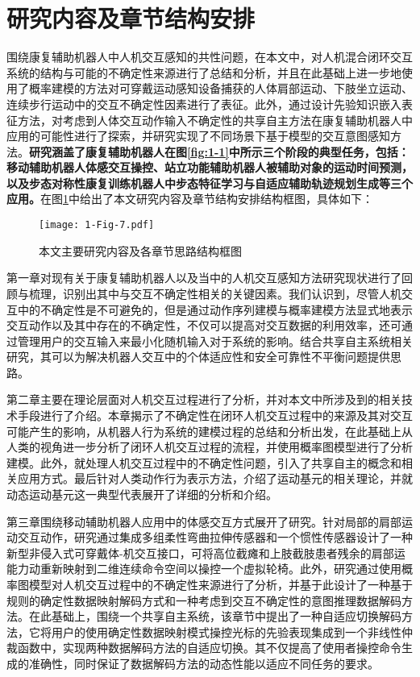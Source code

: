 \section{研究内容及章节结构安排}
围绕康复辅助机器人中人机交互感知的共性问题，在本文中，对人机混合闭环交互系统的结构与可能的不确定性来源进行了总结和分析，并且在此基础上进一步地使用了概率建模的方法对可穿戴运动感知设备捕获的人体肩部运动、下肢坐立运动、连续步行运动中的交互不确定性因素进行了表征。此外，通过设计先验知识嵌入表征方法，对考虑到人体交互动作输入不确定性的共享自主方法在康复辅助机器人中应用的可能性进行了探索，并研究实现了不同场景下基于模型的交互意图感知方法。\textbf{研究涵盖了康复辅助机器人在图\ref{fig:1-1}中所示三个阶段的典型任务，包括：移动辅助机器人体感交互操控、站立功能辅助机器人被辅助对象的运动时间预测，以及步态对称性康复训练机器人中步态特征学习与自适应辅助轨迹规划生成等三个应用。}在图\ref{fig:1-7}中给出了本文研究内容及章节结构安排结构框图，具体如下：

\begin{figure}[htb]
  \centering
  \texttt{[image: 1-Fig-7.pdf]}
  \caption{本文主要研究内容及各章节思路结构框图}
  \label{fig:1-7}
\end{figure}

第一章对现有关于康复辅助机器人以及当中的人机交互感知方法研究现状进行了回顾与梳理，识别出其中与交互不确定性相关的关键因素。我们认识到，尽管人机交互中的不确定性是不可避免的，但是通过动作序列建模与概率建模方法显式地表示交互动作以及其中存在的不确定性，不仅可以提高对交互数据的利用效率，还可通过管理用户的交互输入来最小化随机输入对于系统的影响。结合共享自主系统相关研究，其可以为解决机器人交互中的个体适应性和安全可靠性不平衡问题提供思路。

第二章主要在理论层面对人机交互过程进行了分析，并对本文中所涉及到的相关技术手段进行了介绍。本章揭示了不确定性在闭环人机交互过程中的来源及其对交互可能产生的影响，从机器人行为系统的建模过程的总结和分析出发，在此基础上从人类的视角进一步分析了闭环人机交互过程的流程，并使用概率图模型进行了分析建模。此外，就处理人机交互过程中的不确定性问题，引入了共享自主的概念和相关应用方式。最后针对人类动作行为表示方法，介绍了运动基元的相关理论，并就动态运动基元这一典型代表展开了详细的分析和介绍。

第三章围绕移动辅助机器人应用中的体感交互方式展开了研究。针对局部的肩部运动交互动作，研究通过集成多组柔性弯曲拉伸传感器和一个惯性传感器设计了一种新型非侵入式可穿戴体-机交互接口，可将高位截瘫和上肢截肢患者残余的肩部运能力动重新映射到二维连续命令空间以操控一个虚拟轮椅。此外，研究通过使用概率图模型对人机交互过程中的不确定性来源进行了分析，并基于此设计了一种基于规则的确定性数据映射解码方式和一种考虑到交互不确定性的意图推理数据解码方法。在此基础上，围绕一个共享自主系统，该章节中提出了一种自适应切换解码方法，它将用户的使用确定性数据映射模式操控光标的先验表现集成到一个非线性仲裁函数中，实现两种数据解码方法的自适应切换。其不仅提高了使用者操控命令生成的准确性，同时保证了数据解码方法的动态性能以适应不同任务的要求。

